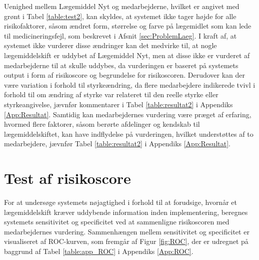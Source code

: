 Uenighed mellem Lægemiddel Nyt og medarbejderne, hvilket er angivet med grønt i Tabel \ref{table:test2}, kan skyldes, at systemet ikke tager højde for alle risikofaktorer, såsom ændret form, størrelse og farve på lægemidlet som kan lede til medicineringsfejl, som beskrevet i Afsnit \ref{sec:ProblemLaeg}. I kraft af, at systemet ikke vurderer disse ændringer kan det medvirke til, at nogle lægemiddelskift er uddybet af Lægemiddel Nyt, men at disse ikke er vurderet af medarbejderne til at skulle uddybes, da vurderingen er baseret på systemets output i form af risikoscore og begrundelse for risikoscoren. Derudover kan der være variation i forhold til styrkeændring, da flere medarbejdere indikerede tvivl i forhold til om ændring af styrke var relateret til den reelle styrke eller styrkeangivelse, jævnfør kommentarer i Tabel \ref{table:resultat2} i Appendiks \ref{App:Resultat}. Samtidig kan medarbejdernes vurdering være præget af erfaring, hvormed flere faktorer, såsom berørte afdelinger og kendskab til lægemiddelskiftet, kan have indflydelse på vurderingen, hvilket understøttes af to medarbejdere, jævnfør Tabel \ref{table:resultat2} i Appendiks \ref{App:Resultat}. %

\section{Test af risikoscore}
For at undersøge systemets nøjagtighed i forhold til at forudsige, hvornår et lægemiddelskift kræver uddybende information inden implementering, beregnes systemets sensitivitet og specificitet ved at sammenligne risikoscoren med medarbejdernes vurdering. Sammenhængen mellem sensitivitet og specificitet er visualiseret af ROC-kurven, som fremgår af Figur \ref{fig:ROC}, der er udregnet på baggrund af Tabel \ref{table:app_ROC} i Appendiks \ref{App:ROC}. 

